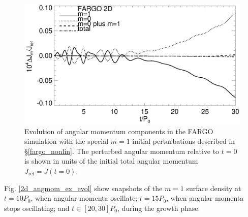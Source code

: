 \begin{figure}
  \includegraphics[width=\linewidth]{figures/nonaxi_evol_ang_fargo_ex}
  \caption{Evolution of angular momentum components in the 
    FARGO simulation with the special $m=1$ initial perturbations
    described in \S\ref{fargo_nonlin}. 
    The perturbed angular momentum
    relative to $t=0$ is shown in units of the initial total angular
    momentum $J_\mathrm{ref}=J(t=0)$.\label{2d_angmom_ex}}  
\end{figure}  

Fig. \ref{2d_angmom_ex_evol} show snapshots of the $m=1$
surface density at $t=10P_0$, when angular momenta oscillate; 
$t=15P_0$, when angular momenta stops oscillating; and
$t\in[20,30]P_0$, during the growth phase. 



